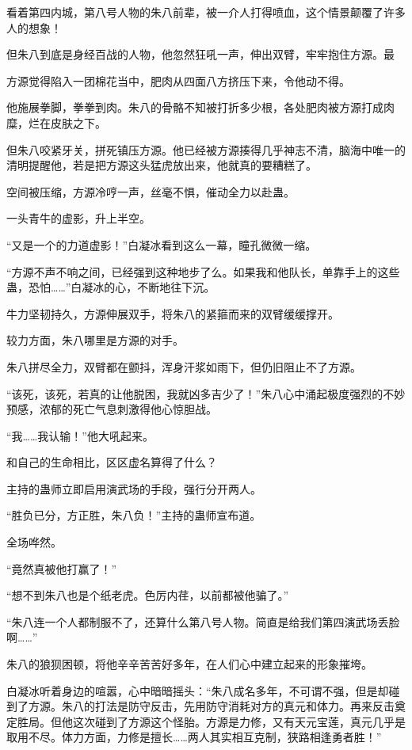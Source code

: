 
\begin{this_body}



看着第四内城，第八号人物的朱八前辈，被一介人打得喷血，这个情景颠覆了许多人的想象！

但朱八到底是身经百战的人物，他忽然狂吼一声，伸出双臂，牢牢抱住方源。最

方源觉得陷入一团棉花当中，肥肉从四面八方挤压下来，令他动不得。

他施展拳脚，拳拳到肉。朱八的骨骼不知被打折多少根，各处肥肉被方源打成肉糜，烂在皮肤之下。

但朱八咬紧牙关，拼死镇压方源。他已经被方源揍得几乎神志不清，脑海中唯一的清明提醒他，若是把方源这头猛虎放出来，他就真的要糟糕了。

空间被压缩，方源冷哼一声，丝毫不惧，催动全力以赴蛊。

一头青牛的虚影，升上半空。

“又是一个的力道虚影！”白凝冰看到这么一幕，瞳孔微微一缩。

“方源不声不响之间，已经强到这种地步了么。如果我和他队长，单靠手上的这些蛊，恐怕……”白凝冰的心，不断地往下沉。

牛力坚韧持久，方源伸展双手，将朱八的紧箍而来的双臂缓缓撑开。

较力方面，朱八哪里是方源的对手。

朱八拼尽全力，双臂都在颤抖，浑身汗浆如雨下，但仍旧阻止不了方源。

“该死，该死，若真的让他脱困，我就凶多吉少了！”朱八心中涌起极度强烈的不妙预感，浓郁的死亡气息刺激得他心惊胆战。

“我……我认输！”他大吼起来。

和自己的生命相比，区区虚名算得了什么？

主持的蛊师立即启用演武场的手段，强行分开两人。

“胜负已分，方正胜，朱八负！”主持的蛊师宣布道。

全场哗然。

“竟然真被他打赢了！”

“想不到朱八也是个纸老虎。色厉内荏，以前都被他骗了。”

“朱八连一个人都制服不了，还算什么第八号人物。简直是给我们第四演武场丢脸啊……”

朱八的狼狈困顿，将他辛辛苦苦好多年，在人们心中建立起来的形象摧垮。

白凝冰听着身边的喧嚣，心中暗暗摇头：“朱八成名多年，不可谓不强，但是却碰到了方源。朱八的打法是防守反击，先用防守消耗对方的真元和体力。再来反击奠定胜局。但他这次碰到了方源这个怪胎。方源是力修，又有天元宝莲，真元几乎是取用不尽。体力方面，力修是擅长……两人其实相互克制，狭路相逢勇者胜！”


\end{this_body}
